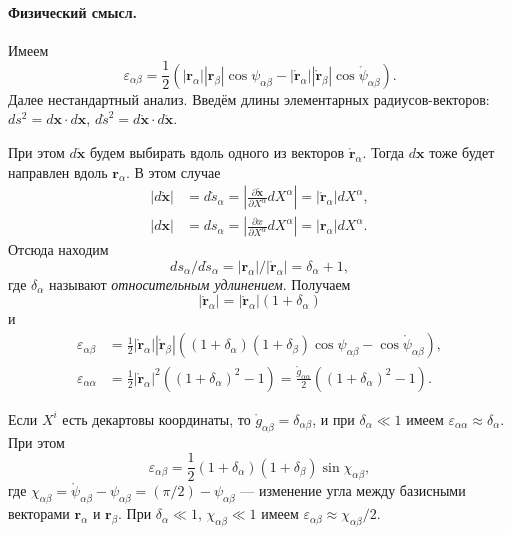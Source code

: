 \paragraph{Физический смысл.} Имеем  
\[
  \varepsilon_{\alpha\beta} =
  \frac{1}{2}(|\mathbf{r}_\alpha||\mathbf{r}_\beta|\cos\psi_{\alpha\beta} -
  |\mathring{\mathbf{r}}_\alpha||
  \mathring{\mathbf{r}}_\beta|\cos\mathring{\psi}_{\alpha\beta}).
\]
Далее нестандартный анализ. Введём длины элементарных радиусов-векторов: $ ds^2
= d\mathbf{x}\cdot d\mathbf{x}$, $ d\mathring{s}^2 = d\mathring{\mathbf{x}}\cdot
d\mathring{\mathbf{x}}$.

При этом $ d\mathring{\mathbf{x}} $ будем выбирать вдоль одного из векторов
$\mathring{\mathbf{r}}_\alpha$. Тогда $ d\mathbf{x} $ тоже будет направлен вдоль
$ \mathbf{r}_\alpha $. В этом случае  
\begin{align*}
  |d\mathring{\mathbf{x}}| &= d\mathring{s}_\alpha = \left| \frac{\partial
  \mathring{\mathbf{x}}}{\partial X^\alpha} dX^\alpha \right| =
  |\mathring{\mathbf{r}}_\alpha | dX^\alpha,\\
    |d\mathbf{x}| &= ds_\alpha = \left| \frac{\partial x}{\partial
  X^\alpha}dX^\alpha \right| = |\mathbf{r}_\alpha | dX^\alpha.
\end{align*}
Отсюда находим  
\[
  ds_\alpha/d\mathring{s}_\alpha =
  |\mathbf{r}_\alpha|/|\mathring{\mathbf{r}}_\alpha| = \delta_\alpha + 1,
\]
где $ \delta_\alpha $ называют \emph{относительным удлинением}. Получаем  
\[
  |\mathring{\mathbf{r}}_\alpha| = |\mathring{\mathbf{r}}_\alpha|(1 +
  \delta_\alpha)
\]
и  
\begin{align*}
  \varepsilon_{\alpha\beta} &= \frac{1}{2}
  |\mathring{\mathbf{r}}_\alpha||\mathring{\mathbf{r}}_\beta|
  ((1+\delta_\alpha)(1+\delta_\beta)\cos\psi_{\alpha\beta} -
  \cos\mathring{\psi}_{\alpha\beta}), \\
  \varepsilon_{\alpha\alpha} &=
  \frac{1}{2}|\mathring{\mathbf{r}}_\alpha|^2((1+\delta_\alpha)^2 - 1) =
  \frac{\mathring{g}_{\alpha\alpha}}{2}((1+\delta_\alpha)^2 - 1).
\end{align*}

Если $ X^i $ есть декартовы координаты, то $ \mathring{g}_{\alpha\beta} =
\delta_{\alpha\beta} $, и при $ \delta_\alpha \ll 1 $ имеем $
\varepsilon_{\alpha\alpha} \approx \delta_\alpha $. При этом  
\[
  \varepsilon_{\alpha\beta} =
  \frac{1}{2}(1+\delta_\alpha)(1+\delta_\beta)\sin\chi_{\alpha\beta},
\]
где $ \chi_{\alpha\beta} = \mathring{\psi}_{\alpha\beta} - \psi_{\alpha\beta} =
(\pi/2) - \psi_{\alpha\beta}$ --- изменение угла между базисными векторами $
\mathbf{r}_\alpha $ и $ \mathbf{r}_\beta $. При $ \delta_\alpha \ll 1 $, $
\chi_{\alpha\beta} \ll 1 $ имеем $ \varepsilon_{\alpha\beta} \approx
\chi_{\alpha\beta}/2 $.

